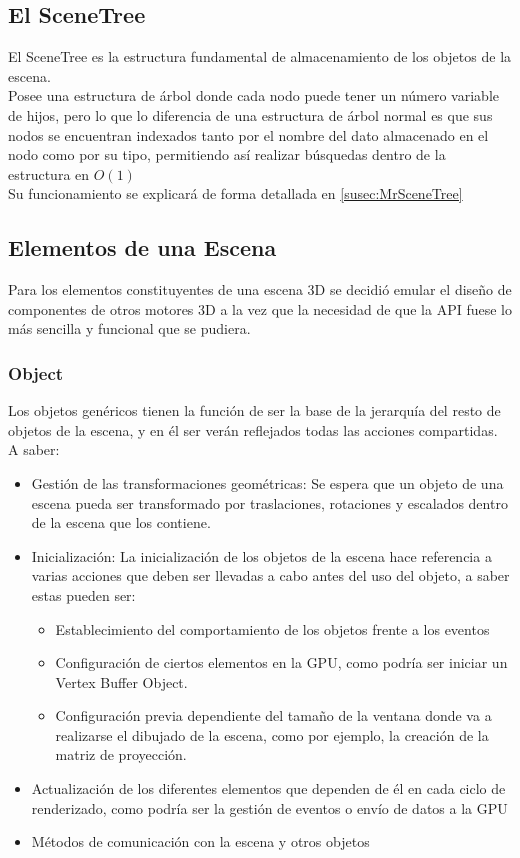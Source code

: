 \subsection{El SceneTree}
El SceneTree es la estructura fundamental de almacenamiento de los objetos de la escena.\\
Posee una estructura de árbol donde cada nodo puede tener un número variable de hijos, pero lo que lo diferencia de una estructura de árbol normal es que sus nodos se encuentran indexados tanto por el nombre del dato almacenado en el nodo como por su tipo, permitiendo así realizar búsquedas dentro de la estructura en $O(1)$\\
Su funcionamiento se explicará de forma detallada en \ref{susec:MrSceneTree}

\subsection{Elementos de una Escena}
Para los elementos constituyentes de una escena 3D se decidió emular el diseño de componentes de otros motores 3D a la vez que la necesidad de que la API fuese lo más sencilla y funcional que se pudiera.\\

\subsubsection{Object}
Los objetos genéricos tienen la función de ser la base de la jerarquía del resto de objetos de la escena, y en él ser verán reflejados todas las acciones compartidas. A saber:

\begin{itemize}
\item Gestión de las transformaciones geométricas:\newline
Se espera que un objeto de una escena pueda ser transformado por traslaciones, rotaciones y escalados dentro de la escena que los contiene.
\item Inicialización:\newline
La inicialización de los objetos de la escena hace referencia a varias acciones que deben ser llevadas a cabo antes del uso del objeto, a saber estas pueden ser:
\begin{itemize}
\item Establecimiento del comportamiento de los objetos frente a los eventos
\item Configuración de ciertos elementos en la GPU, como podría ser iniciar un Vertex Buffer Object.
\item Configuración previa dependiente del tamaño de la ventana donde va a realizarse el dibujado de la escena, como por ejemplo, la creación de la matriz de proyección.
\end{itemize}
\item Actualización de los diferentes elementos que dependen de él en cada ciclo de renderizado, como podría ser la gestión de eventos o envío de datos a la GPU
\item Métodos de comunicación con la escena y otros objetos
\end{itemize}

